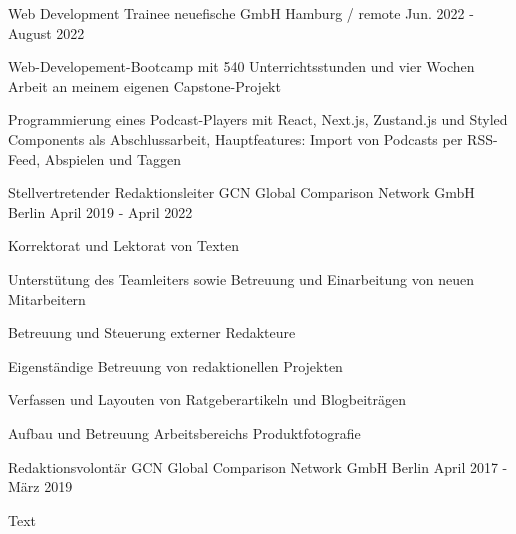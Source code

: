 

\begin{cventries}

  \cventry
    {Web Development Trainee} %
    {neuefische GmbH} %
    {Hamburg / remote} %
    {Jun. 2022 - August 2022} %
    {
      \begin{cvitems} %
        \item {Web-Developement-Bootcamp mit 540 Unterrichtsstunden und vier Wochen Arbeit an meinem eigenen Capstone-Projekt}
        \item {Programmierung eines Podcast-Players mit React, Next.js, Zustand.js und Styled Components als Abschlussarbeit, Hauptfeatures: Import von Podcasts per RSS-Feed, Abspielen und Taggen}
      \end{cvitems}
    }

  \cventry
    {Stellvertretender Redaktionsleiter} %
    {GCN Global Comparison Network GmbH} %
    {Berlin} %
    {April 2019 - April 2022} %
    {
      \begin{cvitems} %
        \item {Korrektorat und Lektorat von Texten}
        \item {Unterstütung des Teamleiters sowie Betreuung und Einarbeitung von neuen Mitarbeitern}
        \item {Betreuung und Steuerung externer Redakteure}
        \item {Eigenständige Betreuung von redaktionellen Projekten}
        \item {Verfassen und Layouten von Ratgeberartikeln und Blogbeiträgen}
        \item {Aufbau und Betreuung Arbeitsbereichs Produktfotografie}
      \end{cvitems}
    }

  \cventry
    {Redaktionsvolontär} %
    {GCN Global Comparison Network GmbH} %
    {Berlin} %
    {April 2017 - März 2019} %
    {
      \begin{cvitems} %
        \item {Text}
       \end{cvitems}
    }


\end{cventries}
